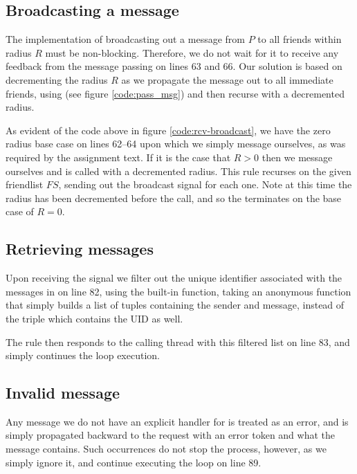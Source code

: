 \subsection{Broadcasting a message}
The implementation of broadcasting out a message from $P$ to all friends
within radius $R$ must be non-blocking. Therefore, we do not wait for it to
receive any feedback from the message passing on lines 63 and 66. Our solution
is based on decrementing the radius $R$ as we propagate the message out to all
immediate friends, using  (see figure \ref{code:pass_msg}) and
then recurse with a decremented radius.


As evident of the code above in figure \ref{code:rcv-broadcast}, we have the
zero radius base case on lines 62--64 upon which we simply message ourselves,
as was required by the assignment text. If it is the case that $R > 0$ then we
message ourselves and  is called with a decremented radius.
This rule recurses on the given friendlist $FS$, sending out the broadcast
signal for each one. Note at this time the radius has been decremented before
the call, and so the terminates on the base case of $R=0$.


\subsection{Retrieving messages}
Upon receiving the  signal we filter out the unique identifier
associated with the messages in  on line 82, using the built-in
 function, taking an anonymous function that simply builds a
list of tuples containing the sender and message, instead of the triple which
contains the UID as well.


The rule then responds to the calling thread with this filtered list on line
83, and simply continues the loop execution.

\subsection{Invalid message}
Any message we do not have an explicit handler for is treated as an error, and
is simply propagated backward to the request with an error token and what the
message contains. Such occurrences do not stop the process, however, as we
simply ignore it, and continue executing the loop on line 89.



